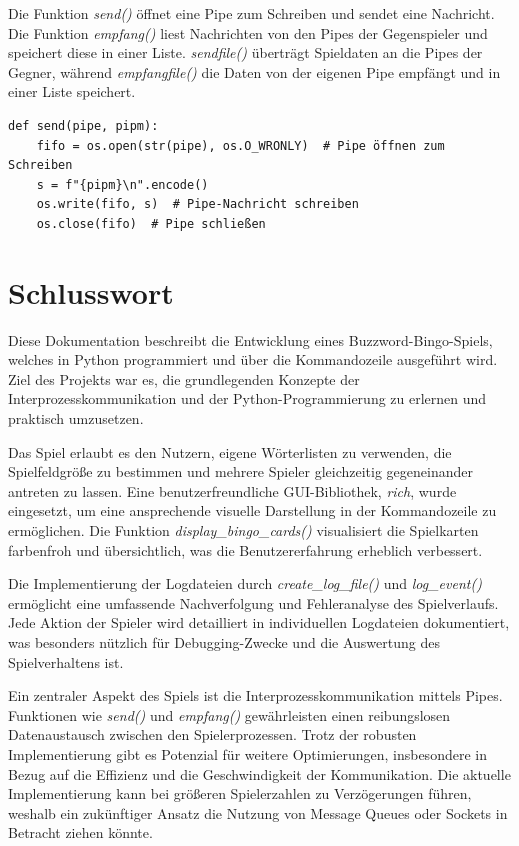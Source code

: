 \documentclass{llncs}
\begin{document}
Die Funktion \textit{send()} öffnet eine Pipe zum Schreiben und sendet eine Nachricht. Die Funktion \textit{empfang()} liest Nachrichten von den Pipes der Gegenspieler und speichert diese in einer Liste. \textit{sendfile()} überträgt Spieldaten an die Pipes der Gegner, während \textit{empfangfile()} die Daten von der eigenen Pipe empfängt und in einer Liste speichert.

\begin{lstlisting}[caption=Nachricht an Pipe senden]
def send(pipe, pipm):
    fifo = os.open(str(pipe), os.O_WRONLY)  # Pipe öffnen zum Schreiben
    s = f"{pipm}\n".encode()
    os.write(fifo, s)  # Pipe-Nachricht schreiben
    os.close(fifo)  # Pipe schließen
\end{lstlisting}


\section{Schlusswort}

Diese Dokumentation beschreibt die Entwicklung eines Buzzword-Bingo-Spiels, welches in Python programmiert und über die Kommandozeile ausgeführt wird. Ziel des Projekts war es, die grundlegenden Konzepte der Interprozesskommunikation und der Python-Programmierung zu erlernen und praktisch umzusetzen.

Das Spiel erlaubt es den Nutzern, eigene Wörterlisten zu verwenden, die Spielfeldgröße zu bestimmen und mehrere Spieler gleichzeitig gegeneinander antreten zu lassen. Eine benutzerfreundliche GUI-Bibliothek, \textit{rich}, wurde eingesetzt, um eine ansprechende visuelle Darstellung in der Kommandozeile zu ermöglichen. Die Funktion \textit{display\_bingo\_cards()} visualisiert die Spielkarten farbenfroh und übersichtlich, was die Benutzererfahrung erheblich verbessert.

Die Implementierung der Logdateien durch \textit{create\_log\_file()} und \textit{log\_event()} ermöglicht eine umfassende Nachverfolgung und Fehleranalyse des Spielverlaufs. Jede Aktion der Spieler wird detailliert in individuellen Logdateien dokumentiert, was besonders nützlich für Debugging-Zwecke und die Auswertung des Spielverhaltens ist.

Ein zentraler Aspekt des Spiels ist die Interprozesskommunikation mittels Pipes. Funktionen wie \textit{send()} und \textit{empfang()} gewährleisten einen reibungslosen Datenaustausch zwischen den Spielerprozessen. Trotz der robusten Implementierung gibt es Potenzial für weitere Optimierungen, insbesondere in Bezug auf die Effizienz und die Geschwindigkeit der Kommunikation. Die aktuelle Implementierung kann bei größeren Spielerzahlen zu Verzögerungen führen, weshalb ein zukünftiger Ansatz die Nutzung von Message Queues oder Sockets in Betracht ziehen könnte.
\end{document}
